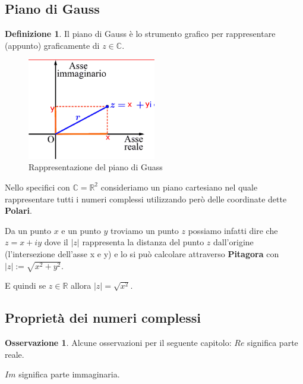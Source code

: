 \documentclass{article}
\theoremstyle{definition}
\newtheorem{definition}{Definizione}[section]
\newtheorem{oss}{Osservazione}[section]
\begin{document}
\newpage
\subsection{Piano di Gauss}\label{sec:piano_di_gauss}
\begin{definition}
        Il piano di Gauss è lo strumento grafico per rappresentare (appunto) graficamente di $ z \in \mathbb{C} $.
        \begin{figure}[h]
                \centering
                        \includegraphics[width=0.5\textwidth]{piano_di_gauss.png}
                        \caption{Rappresentazione del piano di Guass}\label{fig:piano_di_gauss}
        \end{figure}\newline
        Nello specifici con $\mathbb{C} = \mathbb{R}^2$ consideriamo un piano cartesiano nel quale rappresentare tutti i numeri complessi utilizzando però delle coordinate dette \textbf{Polari}. \par
Da un punto $x$ e un punto $y$ troviamo un punto $z$ possiamo infatti dire che $z = x+iy $ dove il $|z|$  rappresenta la distanza del punto $z$ dall'origine (l'intersezione dell'asse x e y) e lo si può calcolare attraverso \textbf{Pitagora} con $|z| := \sqrt{x^2+y^2}$. \par
E quindi se $z \in \mathbb{R}$ allora $|z| = \sqrt{x^2}$. \par
\end{definition}



\subsection{Proprietà dei numeri complessi}\label{sec:proprieta_dei_numeri_complessi}
\begin{tcolorbox}
\begin{oss}
        Alcune osservazioni per il seguente capitolo: \newline
        $ Re $ significa parte reale. \par
        $ Im $ significa parte immaginaria. 
\end{oss}
\end{tcolorbox}
\end{document}
